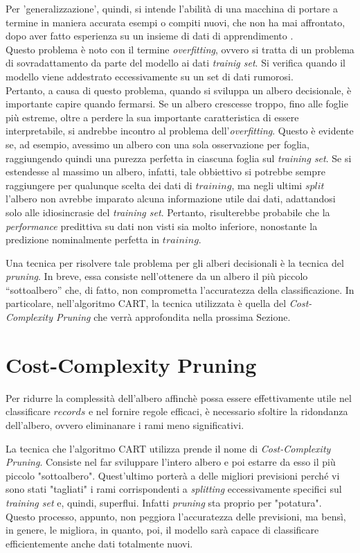 Per 'generalizzazione', quindi, si intende l’abilità di una macchina di portare a termine in maniera accurata esempi o compiti nuovi, che non ha mai affrontato, dopo aver fatto esperienza su un insieme di dati di apprendimento \cite{generalizz:online}.\\
Questo problema è noto con il termine \textit{overfitting}, ovvero si tratta di un problema di sovradattamento da parte del modello ai dati \textit{trainig set}. Si verifica quando il modello viene addestrato eccessivamente su un set di dati rumorosi.\\
Pertanto, a causa di questo problema, quando si sviluppa un albero decisionale, è importante capire quando fermarsi. Se un albero crescesse troppo, fino alle foglie più estreme, oltre a perdere la sua importante caratteristica di essere interpretabile, si andrebbe incontro al problema dell'\textit{overfitting}. Questo è evidente se, ad esempio, avessimo un albero con una sola osservazione per foglia, raggiungendo quindi una purezza perfetta in ciascuna foglia sul \textit{training set}. Se si estendesse al massimo un albero, infatti, tale obbiettivo si potrebbe sempre raggiungere per qualunque scelta dei dati di $training$, ma negli ultimi $split$ l'albero non avrebbe imparato alcuna informazione utile dai dati, adattandosi solo alle idiosincrasie del \textit{training set}. Pertanto, risulterebbe probabile che la \textit{performance} predittiva su dati non visti sia molto inferiore, nonostante la predizione nominalmente perfetta in $training$.

Una tecnica per risolvere tale problema per gli alberi decisionali è la tecnica del \textit{pruning}. In breve, essa consiste nell’ottenere da un albero il più piccolo “sottoalbero” che, di fatto, non comprometta l’accuratezza della classificazione. In particolare, nell'algoritmo CART, la tecnica utilizzata è quella del \textit{Cost-Complexity Pruning} che verrà approfondita nella prossima Sezione.

\section{Cost-Complexity Pruning}
\label{sec:pruning}
Per ridurre la complessità dell'albero affinchè possa essere effettivamente utile nel classificare $records$ e nel fornire regole efficaci, è necessario sfoltire la ridondanza dell’albero, ovvero eliminanare i rami meno significativi.

La tecnica che l'algoritmo CART utilizza prende il nome di \textit{Cost-Complexity Pruning}. Consiste nel far sviluppare l'intero albero e poi estarre da esso il più piccolo "sottoalbero". Quest'ultimo porterà a delle migliori previsioni perché vi sono stati "tagliati" i rami corrispondenti a \textit{splitting} eccessivamente specifici sul \textit{training set} e, quindi, superflui. Infatti \textit{pruning} sta proprio per "potatura".\\ 
Questo processo, appunto, non peggiora l'accuratezza delle previsioni, ma bensì, in genere, le migliora, in quanto, poi, il modello sarà capace di classificare efficientemente anche dati totalmente nuovi.

